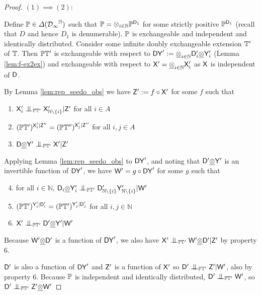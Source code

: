 \begin{proof}
$(1)\implies (2)$:

Define $\mathbb{P}\in \Delta(\mathcal{D_1}^{\mathbb{N}})$ such that $\mathbb{P}=\otimes_{i\in\mathbb{N}} \mathbb{P}^{\mathsf{D}_1}$ for some strictly positive $\mathbb{P}^{\mathsf{D}_1}$ (recall that $D$ and hence $D_1$ is denumerable). $\mathbb{P}$ is exchangeable and independent and identically distributed. Consider some infinite doubly exchangeable extension $\mathbb{T}'$ of $\mathbb{T}$. Then $\mathbb{P}\mathbb{T}'$ is exchangeable with respect to $\mathsf{DY}':=\underline{\otimes}_{i\in \mathbb{N}}\mathsf{D}'_i\underline{\otimes}\mathsf{Y}'_i$ (Lemma \ref{lem:f-ex2ex}) and exchangeable with respect to $\mathsf{X}'=\underline{\otimes}_{i\in\mathbb{N}} \mathsf{X}'_i$ as $\mathsf{X}$ is independent of $\mathsf{D}$.


By Lemma \ref{lem:rep_seedo_obs} we have $\mathsf{Z}':= f\circ\mathsf{X}'$ for some $f$ such that 
\begin{enumerate}
    \item $\RV{X}'_i\CI_{\prob{P}\kernel{T}'}\RV{X}'_{\mathbb{N}\setminus\{i\}}|\RV{Z}'$ for all $i\in A$
    \item $(\mathbb{P}\mathbb{T}')^{\mathsf{X}'_i|\mathsf{Z}''}=(\mathbb{P}\mathbb{T}'')^{\mathsf{X}'_j|\mathsf{Z}''}$ for all $i,j\in A$
    \item $\RV{D}\utimes\RV{Y}'\CI_{\prob{P}\kernel{T}'}\RV{X}'|\RV{Z}'$
\end{enumerate}

Applying Lemma  \ref{lem:rep_seedo_obs} to $\mathsf{DY}'$, and noting that $\mathsf{D}'\underline{\otimes}\mathsf{Y}'$ is an invertible function of $\mathsf{DY}'$, we have $\mathsf{W}'=g\circ\mathsf{DY}'$ for some $g$ such that

\begin{enumerate}
    \setcounter{enumi}{3}
    \item for all $i\in \mathbb{N}$, $\RV{D}_i\utimes\RV{Y}'_i\CI_{\prob{P}\kernel{T}'}\RV{D}'_{\mathbb{N}\setminus\{i\}}\RV{Y}'_{\mathbb{N}\setminus\{i\}}|\RV{W}'$
    \item $(\mathbb{P}\mathbb{T}')^{\mathsf{Y}'_i|\mathsf{D}'_i}=(\mathbb{P}\mathbb{T}')^{\mathsf{Y}'_j|\mathsf{D}'_j}$ for all $i,j\in \mathbb{N}$ 
    \item $\RV{X}'\CI_{\prob{P}\kernel{T}'}\RV{D}'\utimes\RV{Y}'|\RV{W}'$
\end{enumerate}

Because $\mathsf{W}'\underline{\otimes}\mathsf{D}'$ is a function of $\mathsf{DY}'$, we also have $\RV{X}'\CI_{\prob{P}\kernel{T}'} \RV{W}'\utimes\RV{D}'|\RV{Z}'$ by property 6.

$\mathsf{D}'$ is also a function of $\mathsf{DY}'$ and $\mathsf{Z}'$ is a function of $\mathsf{X}'$ so $\RV{D}'\CI_{\prob{P}\kernel{T}'}\RV{Z}'|\RV{W}'$, also by property 6. Because $\mathbb{P}$ is independent and identically distributed, $\RV{D}'\CI_{\prob{P}\kernel{T}'} \RV{W}'$, so $\RV{D}'\CI_{\prob{P}\kernel{T}'}\RV{Z}'\utimes \RV{W}'$


\end{proof}
